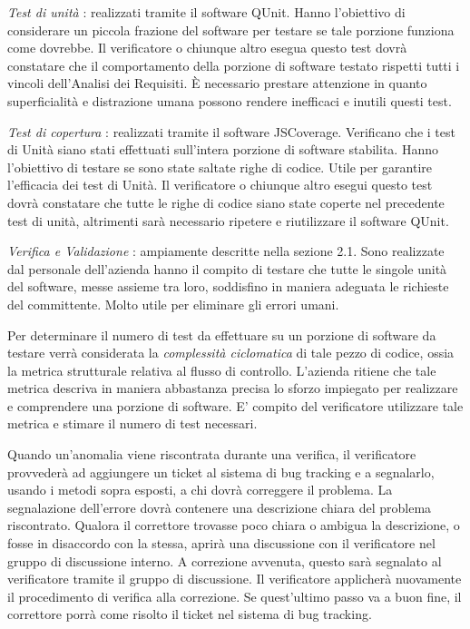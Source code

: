 \begin{elenconumerato}[\textbf{}]{\subsubsecindent}
\item \textit{Test di unit\`a}
: realizzati tramite il software QUnit. Hanno l'obiettivo di considerare un piccola frazione del software per testare se tale porzione funziona come dovrebbe. Il verificatore o chiunque altro esegua questo test dovr\`a constatare che il comportamento della porzione di software testato rispetti tutti i vincoli dell'Analisi dei Requisiti. \`E necessario prestare attenzione in quanto superficialit\`a e distrazione umana possono rendere inefficaci e inutili questi test.
\item \textit{Test di copertura}
: realizzati tramite il software JSCoverage. Verificano che i test di Unit\`a siano stati effettuati sull'intera porzione di software stabilita. Hanno l'obiettivo di testare se sono state saltate righe di codice. Utile per garantire l'efficacia dei test di Unit\`a. 
Il verificatore o chiunque altro esegui questo test dovr\`a constatare che tutte le righe di codice siano state coperte nel precedente test di unit\`a, altrimenti sar\`a necessario ripetere e riutilizzare il software QUnit.

\item \textit{Verifica e Validazione}
: ampiamente descritte nella sezione 2.1. Sono realizzate dal personale dell'azienda hanno il compito di testare che tutte le singole unit\`a del software, messe assieme tra loro, soddisfino in maniera adeguata le richieste del committente. Molto utile per eliminare gli errori umani. 

\end{elenconumerato}

Per determinare il numero di test da effettuare su un porzione di software da testare verr\`a considerata la \textit{complessit\`a ciclomatica} di tale pezzo di codice, ossia la metrica strutturale relativa al flusso di controllo. L'azienda ritiene che tale metrica descriva in maniera abbastanza precisa lo sforzo impiegato per realizzare e comprendere una porzione di software. E' compito del verificatore utilizzare tale metrica e stimare il numero di test necessari.


 
 
Quando un'anomalia viene riscontrata durante una verifica, il verificatore provveder\`a ad aggiungere un ticket al sistema di bug tracking e a segnalarlo, usando i metodi sopra esposti, a chi dovr\`a correggere il problema. La segnalazione dell'errore dovr\`a contenere una descrizione chiara del problema riscontrato. Qualora il correttore trovasse poco chiara o ambigua la descrizione, o fosse in disaccordo con la stessa, aprir\`a una discussione con il verificatore nel gruppo di discussione interno. A correzione avvenuta, questo sar\`a segnalato al verificatore tramite il gruppo di discussione. Il verificatore applicher\`a nuovamente il procedimento di verifica alla correzione. Se quest'ultimo passo va a buon fine, il correttore porr\`a come risolto il ticket nel sistema di bug tracking.
 

